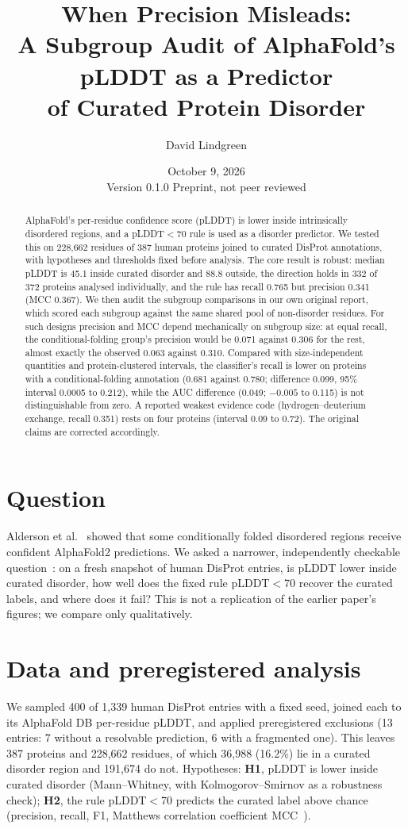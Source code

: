 \documentclass[11pt]{article}
\title{When Precision Misleads:\\
A Subgroup Audit of AlphaFold's pLDDT as a Predictor\\
of Curated Protein Disorder}
\author{David Lindgreen}
\date{October 9, 2026 \\[2pt] \small Version 0.1.0 \quad Preprint, not peer reviewed}
\begin{document}
\maketitle

\begin{abstract}
AlphaFold's per-residue confidence score (pLDDT) is lower inside intrinsically disordered regions, and a pLDDT$<$70
rule is used as a disorder predictor. We tested this on 228{,}662 residues of 387 human proteins joined to curated
DisProt annotations, with hypotheses and thresholds fixed before analysis. The core result is robust: median pLDDT is
45.1 inside curated disorder and 88.8 outside, the direction holds in 332 of 372 proteins analysed individually, and
the rule has recall 0.765 but precision 0.341 (MCC 0.367). We then audit the subgroup comparisons in our own
original report, which scored each subgroup against the same shared pool of non-disorder residues. For such designs
precision and MCC depend mechanically on subgroup size: at equal recall, the conditional-folding group's precision
would be 0.071 against 0.306 for the rest, almost exactly the observed 0.063 against 0.310. Compared with
size-independent quantities and protein-clustered intervals, the classifier's recall is lower on proteins with a
conditional-folding annotation (0.681 against 0.780; difference 0.099, 95\% interval 0.0005 to 0.212), while the
AUC difference (0.049; $-0.005$ to 0.115) is not distinguishable from zero. A reported weakest evidence code
(hydrogen--deuterium exchange, recall 0.351) rests on four proteins (interval 0.09 to 0.72). The original claims are
corrected accordingly.
\end{abstract}

\section{Question}
Alderson et al.~\cite{alderson2023} showed that some conditionally folded disordered regions receive confident
AlphaFold2 predictions. We asked a narrower, independently checkable question~\cite{jumper2021}: on a fresh
snapshot of human DisProt entries, is pLDDT lower inside curated disorder, how well does the fixed rule pLDDT$<$70
recover the curated labels, and where does it fail? This is not a replication of the earlier paper's figures; we compare
only qualitatively.

\section{Data and preregistered analysis}
We sampled 400 of 1{,}339 human DisProt entries with a fixed seed, joined each to its AlphaFold DB per-residue pLDDT,
and applied preregistered exclusions (13 entries: 7 without a resolvable prediction, 6 with a fragmented one). This
leaves 387 proteins and 228{,}662 residues, of which 36{,}988 (16.2\%) lie in a curated disorder region and 191{,}674 do
not. Hypotheses: \textbf{H1}, pLDDT is lower inside curated disorder (Mann--Whitney, with Kolmogorov--Smirnov as a
robustness check); \textbf{H2}, the rule pLDDT$<$70 predicts the curated label above chance (precision, recall, F1,
Matthews correlation coefficient MCC~\cite{matthews1975}).
\end{document}
